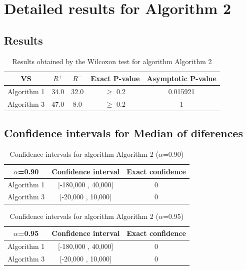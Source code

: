 \documentclass[a4paper,10pt]{article}
\begin{document}
 \clearpage 


\section{Detailed results for Algorithm 2}


\subsection{Results}

\begin{table}[!htp]
\centering\small
\begin{tabular}{
|c|c|c|c|c|}
\hline
 VS & $R^{+}$ & $R^{-}$ & Exact P-value & Asymptotic P-value \\ \hline 
Algorithm 1 & 34.0 & 32.0 & $\geq$ 0.2 & 0.015921\\ \hline 
Algorithm 3 & 47.0 & 8.0 & $\geq$ 0.2 & 1\\ \hline 

\end{tabular}
\caption{Results obtained by the Wilcoxon test for algorithm Algorithm 2}
\end{table}

\subsection{Confidence intervals for Median of diferences}

\begin{table}[!htp]
\centering\small
\begin{tabular}{
|c|c|c|}
\hline
 $\alpha$=0.90 & Confidence interval & Exact confidence \\ \hline 
Algorithm 1 & [-180,000 , 40,000] & 0\\ \hline 
Algorithm 3 & [-20,000 , 10,000] & 0\\ \hline 

\end{tabular}
\caption{Confidence intervals for algorithm Algorithm 2 ($\alpha$=0.90)}
\end{table}
\begin{table}[!htp]
\centering\small
\begin{tabular}{
|c|c|c|}
\hline
 $\alpha$=0.95 & Confidence interval & Exact confidence \\ \hline 
Algorithm 1 & [-180,000 , 40,000] & 0\\ \hline 
Algorithm 3 & [-20,000 , 10,000] & 0\\ \hline 

\end{tabular}
\caption{Confidence intervals for algorithm Algorithm 2 ($\alpha$=0.95)}
\end{table}
\end{document}

